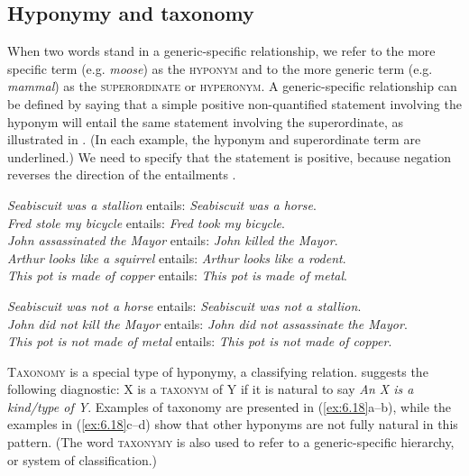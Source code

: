 \subsection{Hyponymy and taxonomy}\label{sec:} %

When two words stand in a generic-specific relationship, we refer to the more specific term (e.g. \textit{moose}) as the \textsc{hyponym} and to the more generic term (e.g. \textit{mammal}) as the \textsc{superordinate} or \textsc{hyperonym}. A generic-specific relationship can be defined by saying that a simple positive non-quantified statement involving the hyponym will entail the same statement involving the superordinate, as illustrated in . (In each example, the hyponym and superordinate term are underlined.) We need to specify that the statement is positive, because negation reverses the direction of the entailments .


\ea \label{ex:6.16}
\ea \textit{Seabiscuit was a stallion}  entails:  \textit{Seabiscuit was a horse}.\\
\ex \textit{Fred stole} \textit{my bicycle}  entails:  \textit{Fred took} \textit{my bicycle}.\\
\ex \textit{John assassinated} \textit{the Mayor}  entails:  \textit{John killed} \textit{the Mayor}.\\
\ex \textit{Arthur looks like a squirrel}  entails:  \textit{Arthur looks like a rodent}.\\
\ex \textit{This pot is made of copper}  entails:  \textit{This pot is made of metal}.
                       \z
\z

\ea \label{ex:6.17}
\ea \textit{Seabiscuit was not a horse}  entails:  \textit{Seabiscuit was not a stallion}.\\
\ex \textit{John did not kill} \textit{the Mayor}  entails:  \textit{John did not assassinate} \textit{the Mayor}.\\
\ex \textit{This pot is not made of metal}  entails:  \textit{This pot is not made of copper}.
                       \z
\z


\textsc{Taxonomy} is a special type of hyponymy, a classifying relation. \citet[137]{Cruse1986} suggests the following diagnostic: X is a \textsc{taxonym} of Y if it is natural to say \textit{An X is a kind/type of Y}. Examples of taxonomy are presented in (\ref{ex:6.18}a--b), while the examples in (\ref{ex:6.18}c--d) show that other hyponyms are not fully natural in this pattern. (The word \textsc{taxonymy} is also used to refer to a generic-specific hierarchy, or system of classification.)


